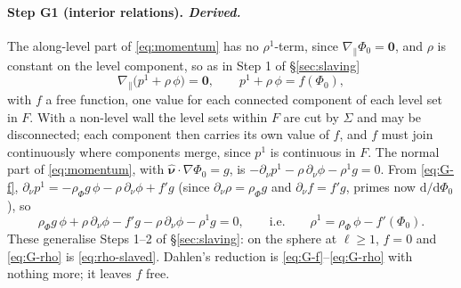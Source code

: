 \documentclass[11pt]{article}
\newcommand{\nuh}{\hat{\boldsymbol{\nu}}}
\begin{document}
\paragraph{Step G1 (interior relations). \emph{Derived.}} The
along-level part of \eqref{eq:momentum} has no $\rho^1$-term, since
$\nabla_{\!\parallel}\Phi_0 = \mathbf 0$, and $\rho$ is constant on the
level component, so as in Step 1 of \S\ref{sec:slaving}
\begin{equation}
  \nabla_{\!\parallel}\bigl(p^1 + \rho\,\phi\bigr) = \mathbf 0,
  \qquad
  p^1 + \rho\,\phi = f(\Phi_0),
  \label{eq:G-f}
\end{equation}
with $f$ a free function, one value for each connected component of
each level set in $F$. With a non-level wall the level sets within $F$
are cut by $\Sigma$ and may be disconnected; each component then
carries its own value of $f$, and $f$ must join continuously where
components merge, since $p^1$ is continuous in $F$. The normal part of
\eqref{eq:momentum}, with $\nuh\cdot\nabla\Phi_0 = g$, is
$-\partial_\nu p^1 - \rho\,\partial_\nu\phi - \rho^1 g = 0$. From
\eqref{eq:G-f}, $\partial_\nu p^1 = -\rho_\Phi g\,\phi - \rho\,\partial_\nu\phi
+ f' g$ (since $\partial_\nu\rho = \rho_\Phi g$ and
$\partial_\nu f = f' g$, primes now $\mathrm{d}/\mathrm{d}\Phi_0$), so
\begin{equation}
  \rho_\Phi g\,\phi + \rho\,\partial_\nu\phi - f' g - \rho\,\partial_\nu\phi
  - \rho^1 g = 0,
  \qquad\text{i.e.}\qquad
  \rho^1 = \rho_\Phi\,\phi - f'(\Phi_0) .
  \label{eq:G-rho}
\end{equation}
These generalise Steps 1--2 of \S\ref{sec:slaving}: on the sphere at
$\ell \ge 1$, $f = 0$ and \eqref{eq:G-rho} is \eqref{eq:rho-slaved}.
Dahlen's reduction is \eqref{eq:G-f}--\eqref{eq:G-rho} with nothing
more; it leaves $f$ free.
\end{document}

